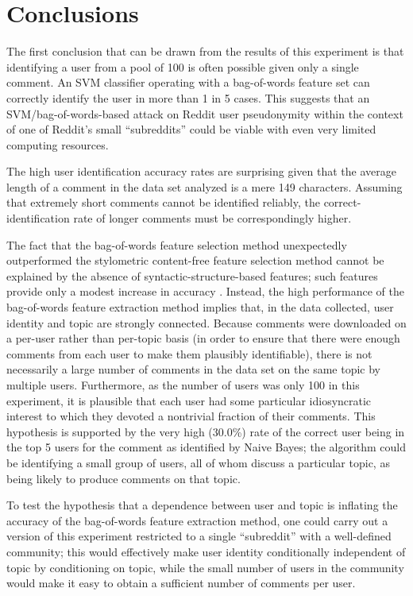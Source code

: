 \documentclass[12pt]{article}
\begin{document}
\section{Conclusions}

The first conclusion that can be drawn from the results of this experiment is that identifying a user from a pool of 100 is often possible given only a single comment. An SVM classifier operating with a bag-of-words feature set can correctly identify the user in more than 1 in 5 cases. This suggests that an SVM/bag-of-words-based attack on Reddit user pseudonymity within the context of one of Reddit's small ``subreddits'' could be viable with even very limited computing resources.

The high user identification accuracy rates are surprising given that the average length of a comment in the data set analyzed is a mere 149 characters. Assuming that extremely short comments cannot be identified reliably, the correct-identification rate of longer comments must be correspondingly higher.

The fact that the bag-of-words feature selection method unexpectedly outperformed the stylometric content-free feature selection method cannot be explained by the absence of syntactic-structure-based features; such features provide only a modest increase in accuracy \cite{narayanan2012feasibility}. Instead, the high performance of the bag-of-words feature extraction method implies that, in the data collected, user identity and topic are strongly connected. Because comments were downloaded on a per-user rather than per-topic basis (in order to ensure that there were enough comments from each user to make them plausibly identifiable), there is not necessarily a large number of comments in the data set on the same topic by multiple users. Furthermore, as the number of users was only 100 in this experiment, it is plausible that each user had some particular idiosyncratic interest to which they devoted a nontrivial fraction of their comments. This hypothesis is supported by the very high (30.0\%) rate of the correct user being in the top 5 users for the comment as identified by Naive Bayes; the algorithm could be identifying a small group of users, all of whom discuss a particular topic, as being likely to produce comments on that topic. 

To test the hypothesis that a dependence between user and topic is inflating the accuracy of the bag-of-words feature extraction method, one could carry out a version of this experiment restricted to a single ``subreddit'' with a well-defined community; this would effectively make user identity conditionally independent of topic by conditioning on topic, while the small number of users in the community would make it easy to obtain a sufficient number of comments per user.
\end{document}
